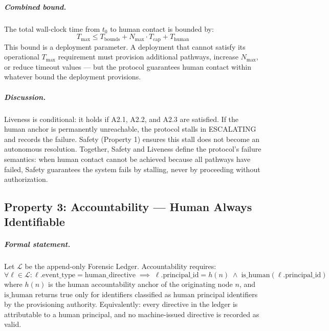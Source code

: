 \subparagraph{Combined bound.} The total wall-clock time from $t_0$ to human contact is bounded by:
\begin{equation}
T_{\max} \leq T_{\text{bounds}} + N_{\max} \cdot T_{\text{cap}} + T_{\text{human}}
\end{equation}
This bound is a deployment parameter. A deployment that cannot satisfy its operational $T_{\max}$ requirement must provision additional pathways, increase $N_{\max}$, or reduce timeout values — but the protocol guarantees human contact within whatever bound the deployment provisions.

\subparagraph{Discussion.} Liveness is conditional: it holds if A2.1, A2.2, and A2.3 are satisfied. If the human anchor is permanently unreachable, the protocol stalls in ESCALATING and records the failure. Safety (Property 1) ensures this stall does not become an autonomous resolution. Together, Safety and Liveness define the protocol's failure semantics: when human contact cannot be achieved because all pathways have failed, Safety guarantees the system fails by stalling, never by proceeding without authorization.

\subsection{Property 3: Accountability — Human Always Identifiable}


\subparagraph{Formal statement.} Let $\mathcal{L}$ be the append-only Forensic Ledger. Accountability requires:
\begin{equation}
\forall \ell \in \mathcal{L} : \ell.\text{event\_type} = \text{human\_directive}
\;\implies\;
\ell.\text{principal\_id} = h(n) \;\land\; \text{is\_human}(\ell.\text{principal\_id})
\end{equation}
where $h(n)$ is the human accountability anchor of the originating node $n$, and $\text{is\_human}$ returns true only for identifiers classified as human principal identifiers by the provisioning authority. Equivalently: every directive in the ledger is attributable to a human principal, and no machine-issued directive is recorded as valid.

